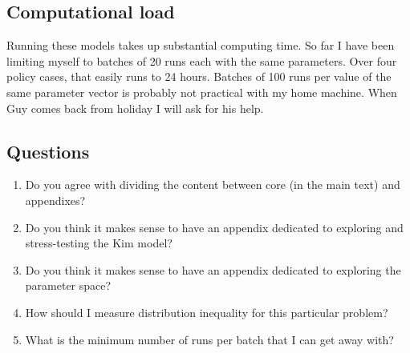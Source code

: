 \documentclass{article}
\begin{document}
\subsection{Computational load}

Running these models takes up substantial computing time. So far I have been limiting myself to batches of 20 runs each with the same parameters. Over four policy cases, that easily runs to 24 hours. Batches of 100 runs per value of the same parameter vector is probably not practical with my home machine. When Guy comes back from holiday I will ask for his help. 

\subsection{Questions}

\begin{enumerate}
	\item Do you agree with dividing the content between core (in the main text) and appendixes? 
	\item Do you think it makes sense to have an appendix dedicated to exploring and stress-testing the Kim model?
	\item Do you think it makes sense to have an appendix dedicated to exploring the parameter space?
	\item How should I measure distribution inequality for this particular problem?
	\item What is the minimum number of runs per batch that I can get away with?
\end{enumerate}



	
\end{document}
